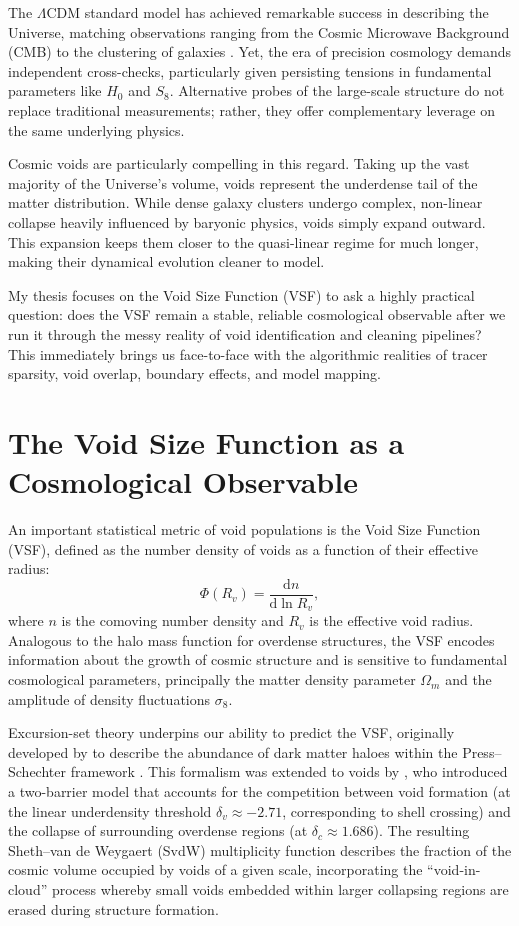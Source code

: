 \documentclass[12pt]{report}
\begin{document}
The $\Lambda$CDM standard model has achieved remarkable success in describing the Universe, matching observations ranging from the Cosmic Microwave Background (CMB) to the clustering of galaxies \citep{Planck2020}. Yet, the era of precision cosmology demands independent cross-checks, particularly given persisting tensions in fundamental parameters like $H_0$ and $S_8$. Alternative probes of the large-scale structure do not replace traditional measurements; rather, they offer complementary leverage on the same underlying physics.

Cosmic voids are particularly compelling in this regard. Taking up the vast majority of the Universe's volume, voids represent the underdense tail of the matter distribution. While dense galaxy clusters undergo complex, non-linear collapse heavily influenced by baryonic physics, voids simply expand outward. This expansion keeps them closer to the quasi-linear regime for much longer, making their dynamical evolution cleaner to model. 

My thesis focuses on the Void Size Function (VSF) to ask a highly practical question: does the VSF remain a stable, reliable cosmological observable after we run it through the messy reality of void identification and cleaning pipelines? This immediately brings us face-to-face with the algorithmic realities of tracer sparsity, void overlap, boundary effects, and model mapping.

\section{The Void Size Function as a Cosmological Observable}

An important statistical metric of void populations is the Void Size Function (VSF), defined as the number density of voids as a function of their effective radius:
\begin{equation}
    \Phi(R_v) = \frac{\mathrm{d}n}{\mathrm{d}\ln R_v}
    \label{eq:vsf_definition},
\end{equation}
where $n$ is the comoving number density and $R_v$ is the effective void radius. Analogous to the halo mass function for overdense structures, the VSF encodes information about the growth of cosmic structure and is sensitive to fundamental cosmological parameters, principally the matter density parameter $\Omega_m$ and the amplitude of density fluctuations $\sigma_8$.

Excursion-set theory underpins our ability to predict the VSF, originally developed by \citet{Bond1991} to describe the abundance of dark matter haloes within the Press--Schechter framework \citep{PressSchechter1974}. This formalism was extended to voids by \citet{Sheth2004}, who introduced a two-barrier model that accounts for the competition between void formation (at the linear underdensity threshold $\delta_v \approx -2.71$, corresponding to shell crossing) and the collapse of surrounding overdense regions (at $\delta_c \approx 1.686$). The resulting Sheth--van de Weygaert (SvdW) multiplicity function describes the fraction of the cosmic volume occupied by voids of a given scale, incorporating the ``void-in-cloud'' process whereby small voids embedded within larger collapsing regions are erased during structure formation.
\end{document}
